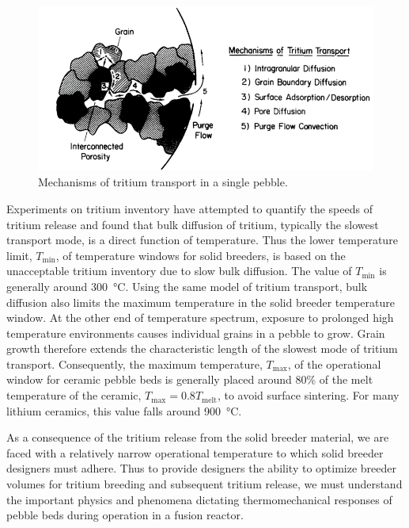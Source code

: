 \begin{figure}[ht]
    \centering
    \includegraphics[width=\singleimagewidth]{figures/mechanisms_tritium_transport} 
    \caption{Mechanisms of tritium transport in a single pebble\cite{Federici1990}.}
    \label{fig:mechanisms_tritium_transport}
\end{figure}

Experiments on tritium inventory have attempted to quantify the speeds of tritium release and found that bulk diffusion of tritium, typically the slowest transport mode, is a direct function of temperature.\cite{Franza2013} Thus the lower temperature limit, $T_\text{min}$, of temperature windows for solid breeders, is based on the unacceptable tritium inventory due to slow bulk diffusion. The value of $T_\text{min}$ is generally around \SI{300}{\celsius}. Using the same model of tritium transport, bulk diffusion also limits the maximum temperature in the solid breeder temperature window. At the other end of temperature spectrum, exposure to prolonged high temperature environments causes individual grains in a pebble to grow. Grain growth therefore extends the characteristic length of the slowest mode of tritium transport. Consequently, the maximum temperature, $T_\text{max}$, of the operational window for ceramic pebble beds is generally placed around 80\% of the melt temperature of the ceramic, $T_\text{max} = 0.8 T_\text{melt}$, to avoid surface sintering. For many lithium ceramics, this value falls around \SI{900}{\celsius}.

As a consequence of the tritium release from the solid breeder material, we are faced with a relatively narrow operational temperature to which solid breeder designers must adhere. Thus to provide designers the ability to optimize breeder volumes for tritium breeding and subsequent tritium release, we must understand the important physics and phenomena dictating thermomechanical responses of pebble beds during operation in a fusion reactor.





